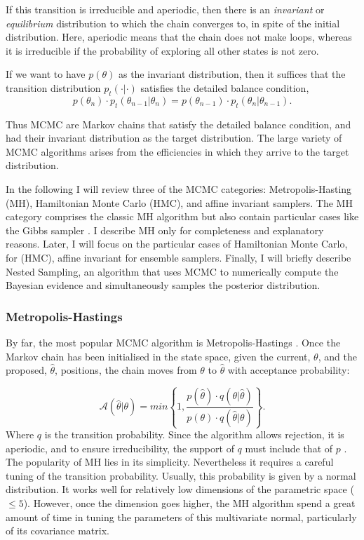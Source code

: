 If this transition is irreducible and aperiodic, then there is an \emph{invariant} or \emph{equilibrium} distribution to which the chain converges to, in spite of the initial distribution. Here, aperiodic means that the chain does not make loops, whereas it is irreducible if the probability of exploring all other states is not zero.

If we want to have $p(\theta)$ as the invariant distribution, then it suffices that the transition distribution $p_t(\cdot | \cdot)$ satisfies the detailed balance condition,
\begin{equation}
\label{eq:detailedbalance}
p(\theta_{n})\cdot p_t(\theta_{n-1}|\theta_n)=p(\theta_{n-1})\cdot p_t(\theta_n | \theta_{n-1}).
\end{equation}

Thus MCMC are Markov chains that satisfy the detailed balance condition, and had their invariant distribution as the target distribution. 
The large variety of MCMC algorithms arises from the efficiencies in which they arrive to the target distribution.

In the following I will review three of the MCMC categories: Metropolis-Hasting (MH), Hamiltonian Monte Carlo (HMC), and affine invariant samplers. The MH category comprises the classic MH algorithm but also contain particular cases like the Gibbs sampler \citep{Geman1984}. I describe MH only for completeness and explanatory reasons. Later, I will focus on the particular cases of Hamiltonian Monte Carlo, for (HMC), affine invariant for ensemble samplers. Finally, I will briefly describe Nested Sampling, an algorithm that uses MCMC to numerically compute the Bayesian evidence and simultaneously samples the posterior distribution. 
\subsubsection{Metropolis-Hastings}
By far, the most popular MCMC algorithm is Metropolis-Hastings \citep{Metropolis1953,Hastings1970}. Once the Markov chain has been initialised in the state space, given the current, $\theta$, and the proposed, $\hat{\theta}$, positions, the chain moves from $\theta$ to $\hat{\theta}$ with acceptance probability:

\begin{equation}
\mathcal{A}(\hat{\theta}|\theta)=min\left\{1,\frac{p(\hat{\theta})\cdot q(\theta|\hat{\theta})}{p(\theta)\cdot q(\hat{\theta}|\theta)}\right\}.
\end{equation}
Where $q$ is the transition probability. Since the algorithm allows rejection, it is aperiodic, and to ensure irreducibility, the support of $q$ must include that of $p$ \citep{Andrieu2003}. The popularity of MH lies in its simplicity. Nevertheless it requires a careful tuning of the transition probability. Usually, this probability is given by a normal distribution. It works well for relatively low dimensions of the parametric space ($\leq 5$). However, once the dimension goes higher, the MH algorithm spend a great amount of time in tuning the parameters of this multivariate normal, particularly of its covariance matrix.

